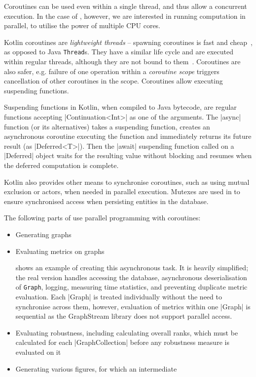 Coroutines can be used even within a single thread, and thus allow a concurrent execution.
In the case of \graffs, however, we are interested in running computation in parallel, to utilise the power of multiple CPU cores.

Kotlin coroutines are \textsl{lightweight threads} -- spawning coroutines is fast and cheap~\cite{AriasFunctionalKotlinExtend2018}, as opposed to Java \texttt{Thread}s.
They have a similar life cycle and are executed within regular threads, although they are not bound to them~\cite{TorresLearningConcurrencyKotlin2018}.
Coroutines are also safer, e.g. failure of one operation within a \textsl{coroutine scope} triggers cancellation of other coroutines in the scope.
Coroutines allow executing suspending functions.

Suspending functions in Kotlin, when compiled to Java bytecode, are regular functions accepting |Continuation<Int>| as one of the arguments.
The |async| function (or its alternatives) takes a suspending function, creates an asynchronous coroutine executing the function and immediately returns its future result (as |Deferred<T>|).
Then the |await| suspending function called on a |Deferred| object waits for the resulting value without blocking and resumes when the deferred computation is complete.



Kotlin also provides other means to synchronise coroutines, such as using mutual exclusion or actors, when needed in parallel execution.
Mutexes are used in \graffs to ensure synchronised access when persisting entities in the database.


The following parts of \graffs use parallel programming with coroutines:
\begin{itemize}[topsep=5pt]
    \item Generating graphs
    \item Evaluating metrics on graphs

     shows an example of creating this asynchronous task.
    It is heavily simplified; the real version handles accessing the database, asynchronous deserialisation of \texttt{Graph}, logging, measuring time statistics, and preventing duplicate metric evaluation.
    Each |Graph| is treated individually without the need to synchronise across them, however, evaluation of metrics within one |Graph| is sequential as the GraphStream library does not support parallel access.
    \item Evaluating robustness, including calculating overall ranks, which must be calculated for each |GraphCollection| before any robustness measure is evaluated on it
    \item Generating various figures, for which an intermediate
\end{itemize}


